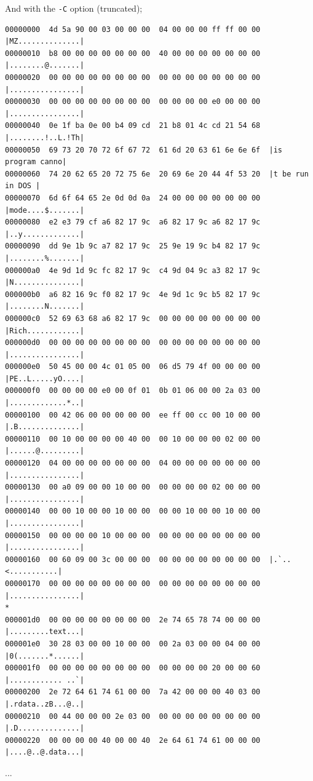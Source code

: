 \documentclass[]{project_plan}
\begin{document}
And with the \lstinline|-C| option (truncated);
\begin{lstlisting}[basicstyle=\tiny]
00000000  4d 5a 90 00 03 00 00 00  04 00 00 00 ff ff 00 00  |MZ..............|
00000010  b8 00 00 00 00 00 00 00  40 00 00 00 00 00 00 00  |........@.......|
00000020  00 00 00 00 00 00 00 00  00 00 00 00 00 00 00 00  |................|
00000030  00 00 00 00 00 00 00 00  00 00 00 00 e0 00 00 00  |................|
00000040  0e 1f ba 0e 00 b4 09 cd  21 b8 01 4c cd 21 54 68  |........!..L.!Th|
00000050  69 73 20 70 72 6f 67 72  61 6d 20 63 61 6e 6e 6f  |is program canno|
00000060  74 20 62 65 20 72 75 6e  20 69 6e 20 44 4f 53 20  |t be run in DOS |
00000070  6d 6f 64 65 2e 0d 0d 0a  24 00 00 00 00 00 00 00  |mode....$.......|
00000080  e2 e3 79 cf a6 82 17 9c  a6 82 17 9c a6 82 17 9c  |..y.............|
00000090  dd 9e 1b 9c a7 82 17 9c  25 9e 19 9c b4 82 17 9c  |........%.......|
000000a0  4e 9d 1d 9c fc 82 17 9c  c4 9d 04 9c a3 82 17 9c  |N...............|
000000b0  a6 82 16 9c f0 82 17 9c  4e 9d 1c 9c b5 82 17 9c  |........N.......|
000000c0  52 69 63 68 a6 82 17 9c  00 00 00 00 00 00 00 00  |Rich............|
000000d0  00 00 00 00 00 00 00 00  00 00 00 00 00 00 00 00  |................|
000000e0  50 45 00 00 4c 01 05 00  06 d5 79 4f 00 00 00 00  |PE..L.....yO....|
000000f0  00 00 00 00 e0 00 0f 01  0b 01 06 00 00 2a 03 00  |.............*..|
00000100  00 42 06 00 00 00 00 00  ee ff 00 cc 00 10 00 00  |.B..............|
00000110  00 10 00 00 00 00 40 00  00 10 00 00 00 02 00 00  |......@.........|
00000120  04 00 00 00 00 00 00 00  04 00 00 00 00 00 00 00  |................|
00000130  00 a0 09 00 00 10 00 00  00 00 00 00 02 00 00 00  |................|
00000140  00 00 10 00 00 10 00 00  00 00 10 00 00 10 00 00  |................|
00000150  00 00 00 00 10 00 00 00  00 00 00 00 00 00 00 00  |................|
00000160  00 60 09 00 3c 00 00 00  00 00 00 00 00 00 00 00  |.`..<...........|
00000170  00 00 00 00 00 00 00 00  00 00 00 00 00 00 00 00  |................|
*
000001d0  00 00 00 00 00 00 00 00  2e 74 65 78 74 00 00 00  |.........text...|
000001e0  30 28 03 00 00 10 00 00  00 2a 03 00 00 04 00 00  |0(.......*......|
000001f0  00 00 00 00 00 00 00 00  00 00 00 00 20 00 00 60  |............ ..`|
00000200  2e 72 64 61 74 61 00 00  7a 42 00 00 00 40 03 00  |.rdata..zB...@..|
00000210  00 44 00 00 00 2e 03 00  00 00 00 00 00 00 00 00  |.D..............|
00000220  00 00 00 00 40 00 00 40  2e 64 61 74 61 00 00 00  |....@..@.data...|
\end{lstlisting}
...
\end{document}
